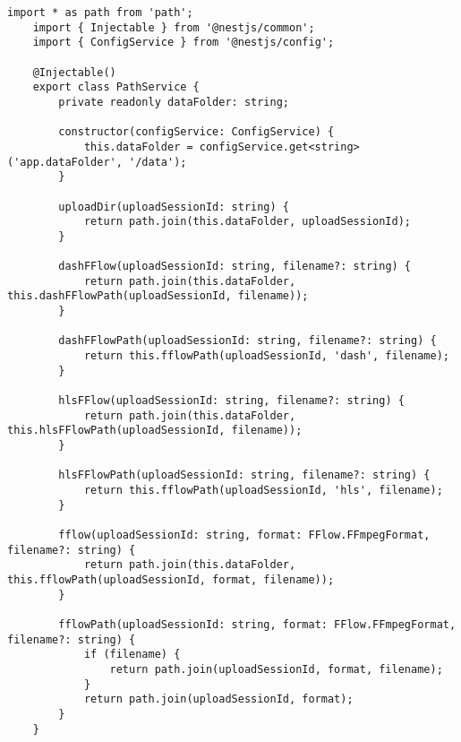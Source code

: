 \begin{lstlisting}[caption={path.service.ts}]
	import * as path from 'path';
	import { Injectable } from '@nestjs/common';
	import { ConfigService } from '@nestjs/config';
	
	@Injectable()
	export class PathService {
		private readonly dataFolder: string;
		
		constructor(configService: ConfigService) {
			this.dataFolder = configService.get<string>('app.dataFolder', '/data');
		}
		
		uploadDir(uploadSessionId: string) {
			return path.join(this.dataFolder, uploadSessionId);
		}
		
		dashFFlow(uploadSessionId: string, filename?: string) {
			return path.join(this.dataFolder, this.dashFFlowPath(uploadSessionId, filename));
		}
		
		dashFFlowPath(uploadSessionId: string, filename?: string) {
			return this.fflowPath(uploadSessionId, 'dash', filename);
		}
		
		hlsFFlow(uploadSessionId: string, filename?: string) {
			return path.join(this.dataFolder, this.hlsFFlowPath(uploadSessionId, filename));
		}
		
		hlsFFlowPath(uploadSessionId: string, filename?: string) {
			return this.fflowPath(uploadSessionId, 'hls', filename);
		}
		
		fflow(uploadSessionId: string, format: FFlow.FFmpegFormat, filename?: string) {
			return path.join(this.dataFolder, this.fflowPath(uploadSessionId, format, filename));
		}
		
		fflowPath(uploadSessionId: string, format: FFlow.FFmpegFormat, filename?: string) {
			if (filename) {
				return path.join(uploadSessionId, format, filename);
			}
			return path.join(uploadSessionId, format);
		}
	}
\end{lstlisting}

